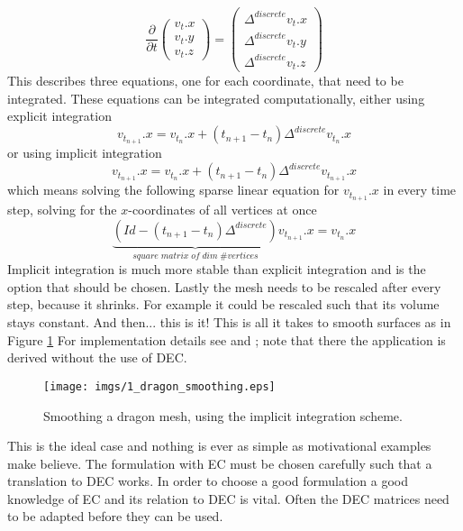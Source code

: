 \[\frac{\partial}{\partial t} \begin{pmatrix}
v_t.x \\
v_t.y\\ 
v_t.z
\end{pmatrix} = \begin{pmatrix}
\Delta^{discrete} v_t.x \\
\Delta^{discrete} v_t.y \\
\Delta^{discrete} v_t.z
\end{pmatrix}\]
This describes three equations, one for each coordinate, that need to be integrated. These equations can be integrated computationally, either using explicit integration
\[v_{t_{n+1}}.x = v_{t_n}.x + (t_{n+1}-t_n) \Delta^{discrete} v_{t_n}.x\]
or using implicit integration
\[v_{t_{n+1}}.x = v_{t_n}.x + (t_{n+1}-t_n) \Delta^{discrete} v_{t_{n+1}}.x\]
which means solving the following sparse linear equation for $v_{t_{n+1}}.x $ in every time step, solving for the $x$-coordinates of all vertices at once
\[\underbrace{(Id - (t_{n+1}-t_n) \Delta^{discrete})}_{square\; matrix\; of \; dim \; \# vertices} v_{t_{n+1}}.x = v_{t_n}.x\]
Implicit integration is much more stable than explicit integration and is the option that should be chosen. Lastly the mesh needs to be rescaled after every step, because it shrinks. For example it could be rescaled such that its volume stays constant. And then... this is it! This is all it takes to smooth surfaces as in Figure \ref{fig:1_dragonsmoothing}  For implementation details see \cite{Desbrun:1999:IFI:311535.311576} and \cite{laplacebeltrami}; note that there the application is derived without the use of DEC.

\begin{figure}%
\texttt{[image: imgs/1\_dragon\_smoothing.eps]}%
\caption{Smoothing a dragon mesh, using the implicit integration scheme.}%
\label{fig:1_dragonsmoothing}%
\end{figure}

This is the ideal case and nothing is ever as simple as motivational examples make believe. The formulation with EC must be chosen carefully such that a translation to DEC works. In order to choose a good formulation a good knowledge of EC and its relation to DEC is vital. Often the DEC matrices need to be adapted before they can be used. %


